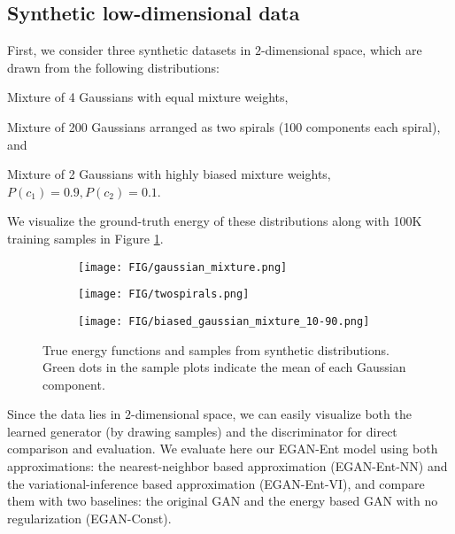 \documentclass[a4paper]{article}
\begin{document}
\subsection{Synthetic low-dimensional data}
\label{sec:synthetic_exp}
First, we consider three synthetic datasets in $2$-dimensional space,
which are drawn from the following distributions:
\begin{inlinelist}
\item Mixture of 4 Gaussians with equal mixture weights,
\item Mixture of 200 Gaussians arranged as two spirals (100 components each spiral), and 
\item Mixture of 2 Gaussians with highly biased mixture weights, $P(c_1) = 0.9, P(c_2) = 0.1$.
\end{inlinelist}
We visualize the ground-truth energy of these distributions along with 100K training samples in Figure \ref{fig:synthetic_distributions}.
\begin{figure}[t!]
	\centering
	\begin{subfigure}{0.325\textwidth}
		\texttt{[image: FIG/gaussian\_mixture.png]}
	\end{subfigure}
    \begin{subfigure}{0.325\textwidth}
		\texttt{[image: FIG/twospirals.png]}
	\end{subfigure}
    \begin{subfigure}{0.325\textwidth}
		\texttt{[image: FIG/biased\_gaussian\_mixture\_10-90.png]}
	\end{subfigure}
	\caption{True energy functions and samples from synthetic distributions. Green dots in the sample plots indicate the mean of each Gaussian component.}
	\label{fig:synthetic_distributions}
\vspace{-0.6em}
\end{figure}
Since the data lies in $2$-dimensional space, we can easily visualize both the learned generator (by drawing samples) and the discriminator for direct comparison and evaluation. 
We evaluate here our EGAN-Ent model using both approximations: the nearest-neighbor based approximation (EGAN-Ent-NN) and the variational-inference based approximation (EGAN-Ent-VI), and compare them with two baselines: the original GAN and the energy based GAN with no regularization (EGAN-Const).
\end{document}
